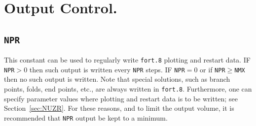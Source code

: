 \documentclass[12pt]{report}
\begin{document}
\section{ Output Control.} \label{sec:Output_control}
\subsection{\tt NPR}  \label{sec:NPR}
 This constant can be used to regularly write {\tt fort.8} plotting and restart 
 data.  
 IF {\tt NPR}$>$0 then such output is written every {\tt NPR} steps.
 IF {\tt NPR}$=$0 or if {\tt NPR}$\ge${\tt NMX} then no such output is written.
 Note that special solutions, such as branch points, folds, end points, etc., 
 are always written in {\tt fort.8}.
 Furthermore, one can specify parameter values where plotting and restart 
 data is to be written; see Section~\ref{sec:NUZR}.
 For these reasons, and to limit the output volume, it is recommended that
 {\tt NPR} output be kept to a minimum.
\end{document}
